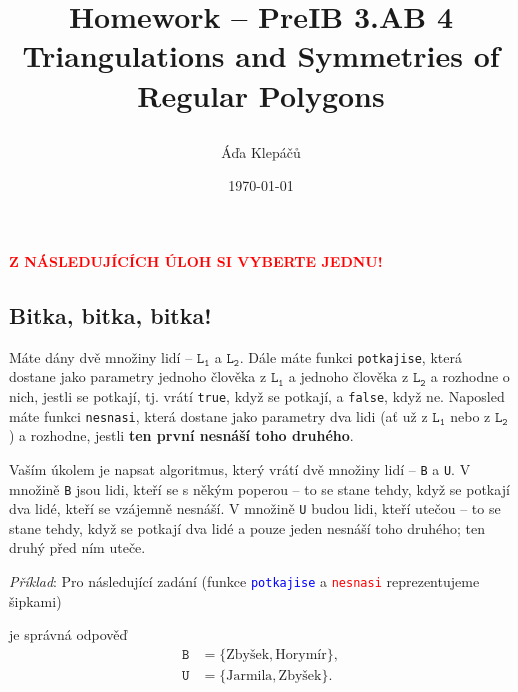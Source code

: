 \documentclass[a4paper,11pt]{article}
\title{\Huge\textsf{Homework -- PreIB 3.AB 4}\\
 \Large\textsf{Triangulations and Symmetries of Regular Polygons}
 \author{Áďa Klepáčů}
 \date{\today}
}
\newcommand{\clr}{\textcolor{red}}
\newcommand{\clb}{\textcolor{blue}}
\begin{document}
\thispagestyle{fancy}

\clr{\textbf{\uppercase{Z následujících úloh si vyberte jednu!}}}

\subsection*{Bitka, bitka, bitka!}
Máte dány dvě množiny lidí -- $\mathtt{L_1}$ a $\mathtt{L_2}$. Dále máte funkci
\texttt{potkajise}, která dostane jako parametry jednoho člověka z
$\mathtt{L_1}$ a jednoho člověka z $\mathtt{L_2}$ a rozhodne o nich, jestli se
potkají, tj. vrátí \texttt{true}, když se potkají, a \texttt{false}, když ne.
Naposled máte funkci \texttt{nesnasi}, která dostane jako parametry dva lidi (ať
už z $\mathtt{L_1}$ nebo z $\mathtt{L_2}$) a rozhodne, jestli \textbf{ten první
 nesnáší toho druhého}.

Vaším úkolem je napsat algoritmus, který vrátí dvě množiny lidí -- \texttt{B} a
\texttt{U}. V množině \texttt{B} jsou lidi, kteří se s někým poperou -- to se
stane tehdy, když se potkají dva lidé, kteří se vzájemně nesnáší. V množině
\texttt{U} budou lidi, kteří utečou -- to se stane tehdy, když se potkají dva
lidé a pouze jeden nesnáší toho druhého; ten druhý před ním uteče.

\emph{Příklad}: Pro následující zadání (funkce \texttt{\clb{potkajise}} a
\texttt{\clr{nesnasi}} reprezentujeme šipkami)
\begin{center}
\end{center}
je správná odpověď
\begin{align*}
 \mathtt{B} &= \{\text{Zbyšek},\text{Horymír}\},\\
 \mathtt{U} &= \{\text{Jarmila},\text{Zbyšek}\}.
\end{align*}
\clearpage
\end{document}
